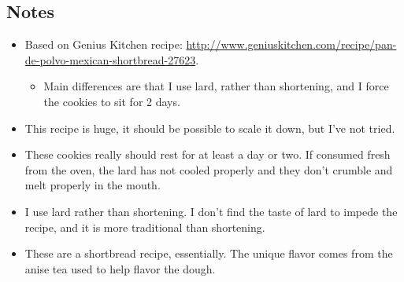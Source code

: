 \begin{multicols}{2}
\subsection*{Notes}
\begin{itemize}
    \item Based on Genius Kitchen recipe: \url{http://www.geniuskitchen.com/recipe/pan-de-polvo-mexican-shortbread-27623}.
    \begin{itemize}
        \item Main differences are that I use lard, rather than shortening, and I force the cookies to sit for 2 days.
    \end{itemize}
    \item This recipe is huge, it should be possible to scale it down, but I've not tried.
    \item These cookies really should rest for at least a day or two. If consumed fresh from the oven, the lard has not cooled properly and they don't crumble and melt properly in the mouth.
    \item I use lard rather than shortening. I don't find the taste of lard to impede the recipe, and it is more traditional than shortening.
    \item These are a shortbread recipe, essentially. The unique flavor comes from the anise tea used to help flavor the dough.
\end{itemize}
\end{multicols}
\clearpage